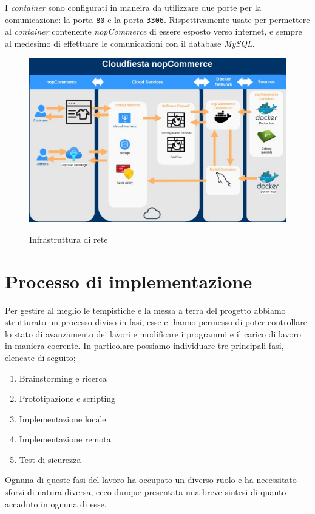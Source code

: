 \documentclass[a4paper]{report}
\begin{document}
		I \emph{container} sono configurati in maneira da utilizzare due porte per la comunicazione: la porta
		\texttt{80} e la porta \texttt{3306}. Rispettivamente usate per permettere al \emph{container} contenente
		\emph{nopCommerce} di essere esposto verso internet, e sempre al medesimo di effettuare le comunicazioni con il
		database \emph{MySQL}.

		\begin{figure}[H]
			\includegraphics[scale=0.3]{DiagrammaDiRete.jpg}\label{fig:architettura_di_rete}
			\caption{Infrastruttura di rete}
		\end{figure}
 

\chapter{Processo di implementazione}\label{processo_di_implementazione}
	Per gestire al meglio le tempistiche e la messa a terra del progetto abbiamo strutturato un processo diviso in fasi,
	esse ci hanno permesso di poter controllare lo stato di avanzamento dei lavori e modificare i programmi e il carico
	di lavoro in maniera coerente. In particolare possiamo individuare tre principali fasi, elencate di seguito;
	\begin{enumerate}
		\item Brainstorming e ricerca
		\item Prototipazione e scripting
		\item Implementazione locale
		\item Implementazione remota
		\item Test di sicurezza
	\end{enumerate}
	Ognuna di queste fasi del lavoro ha occupato un diverso ruolo e ha necessitato sforzi di natura diversa, ecco dunque
	presentata una breve sintesi di quanto accaduto in ognuna di esse.
\end{document}

